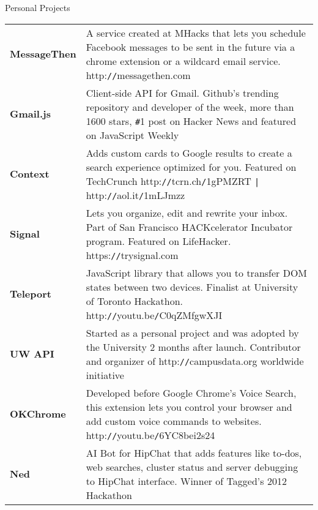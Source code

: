 \documentclass[oneside]{resume}
\begin{document}
  \begin{rSection}{Personal Projects}

    \begin{tabular}{@{} >{\bfseries}l @{\hspace{1ex}:\hspace{1ex}} p{14.5cm}}
      MessageThen & A service created at MHacks that lets you schedule Facebook messages to be sent in the future via
                    a chrome extension or a wildcard email service. http:\texttt{//}messagethen.com \\[0.5ex]

      Gmail.js & Client-side API for Gmail. Github's trending repository and developer of the week, more than 1600 stars,
                 \texttt{\#}1 post on Hacker News and featured on JavaScript Weekly \\[0.5ex]

      Context  & Adds custom cards to Google results to create a search experience optimized for you. 
                 Featured on TechCrunch http:\texttt{//}tcrn.ch\texttt{/}1gPMZRT \texttt{|} http:\texttt{//}aol.it\texttt{/}1mLJmzz \\[0.5ex]

      Signal   & Lets you organize, edit and rewrite your inbox. Part of San Francisco HACKcelerator
                 Incubator program. Featured on LifeHacker. https:\texttt{//}trysignal.com \\[0.5ex]

      Teleport & JavaScript library that allows you to transfer DOM states between two devices.
                 Finalist at University of Toronto Hackathon. http:\texttt{//}youtu.be\texttt{/}C0qZMfgwXJI \\[0.5ex]

      UW API   & Started as a personal project and was adopted by the University 2 months after launch.
                 Contributor and organizer of http:\texttt{//}campusdata.org worldwide initiative  \\[0.5ex]

      OKChrome & Developed before Google Chrome's Voice Search, this extension lets you control your browser
                 and add custom voice commands to websites. http:\texttt{//}youtu.be\texttt{/}6YC8bei2s24 \\[0.5ex]

      Ned      & AI Bot for HipChat that adds features like to-dos, web searches, cluster status and server
                 debugging to HipChat interface. Winner of Tagged's 2012 Hackathon \\
    \end{tabular}

  \end{rSection}
\end{document}
